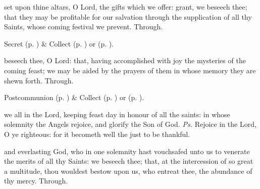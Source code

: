\secret
{} set upon thine altars, O Lord, the gifts which we offer: grant, we beseech thee; that they may be profitable for our salvation through the supplication of all thy Saints, whose coming festival we prevent. Through.

\begin{rubric}
	 Secret  (p. \pageref{SPHolyGhost}) \&  Collect  (p. \pageref{SPAgainst}) or  (p. \pageref{SPChiefBishop}).
\end{rubric}


\postcommunion
{} beseech thee, O Lord: that, having accomplished with joy the mysteries of the coming feast; we may be aided by the prayers of them in whose memory they are shewn forth. Through.

\begin{rubric}
	 Postcommunion  (p. \pageref{SPHolyGhost}) \&  Collect  (p. \pageref{SPAgainst}) or  (p. \pageref{SPChiefBishop}).
\end{rubric}


\label{AllHallows}

\introit
{} we all in the Lord, keeping feast day in honour of all the saints: in whose solemnity the Angels rejoice, and glorify the Son of God. \textit{Ps.} Rejoice in the Lord, O ye righteous: for it becometh well the just to be thankful.

\collect\label{AllHallowsCollect}
 and everlasting God, who in one solemnity hast vouchsafed unto us to venerate the merits of all thy Saints: we beseech thee; that, at the intercession of so great a multitude, thou wouldest bestow upon us, who entreat thee, the abundance of thy mercy. Through.

